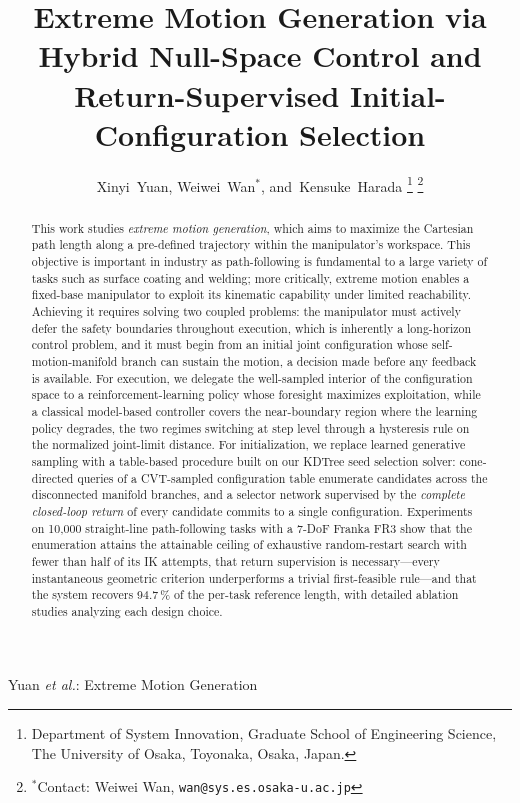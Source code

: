 \documentclass[journal]{IEEEtran}
\newcommand{\nEval}{10{,}000}
\newcommand{\phRatioAll}{94.7}     %
\begin{document}
\title{Extreme Motion Generation via Hybrid Null-Space Control and
Return-Supervised Initial-Configuration Selection}

\author{Xinyi~Yuan, Weiwei~Wan$^{*}$, and~Kensuke~Harada%
\thanks{Department of System Innovation, Graduate School of Engineering
Science, The University of Osaka, Toyonaka, Osaka, Japan.}%
\thanks{$^{*}$Contact: Weiwei Wan, \texttt{wan@sys.es.osaka-u.ac.jp}}}

%
{Yuan \MakeLowercase{\textit{et al.}}: Extreme Motion Generation}

\maketitle

\begin{abstract}
This work studies \textit{extreme motion generation}, which aims to
maximize the Cartesian path length along a pre-defined trajectory within
the manipulator's workspace. This objective is important in industry as
path-following is fundamental to a large variety of tasks such as surface
coating and welding; more critically, extreme motion enables a fixed-base
manipulator to exploit its kinematic capability under limited
reachability. Achieving it requires solving two coupled problems: the
manipulator must actively defer the safety boundaries throughout
execution, which is inherently a long-horizon control problem, and it
must begin from an initial joint configuration whose self-motion-manifold
branch can sustain the motion, a decision made before any feedback is
available. For execution, we delegate the well-sampled interior of the
configuration space to a reinforcement-learning policy whose foresight
maximizes exploitation, while a classical model-based controller covers
the near-boundary region where the learning policy degrades, the two
regimes switching at step level through a hysteresis rule on the
normalized joint-limit distance. For initialization, we replace learned
generative sampling with a table-based procedure built on our KDTree seed
selection solver: cone-directed queries of a CVT-sampled configuration
table enumerate candidates across the disconnected manifold branches, and
a selector network supervised by the \textit{complete closed-loop return}
of every candidate commits to a single configuration. Experiments on
\nEval{} straight-line path-following tasks with a 7-DoF Franka FR3 show
that the enumeration attains the attainable ceiling of exhaustive
random-restart search with fewer than half of its IK attempts, that
return supervision is necessary---every instantaneous geometric criterion
underperforms a trivial first-feasible rule---and that the system
recovers \phRatioAll\,\% of the per-task reference length, with detailed
ablation studies analyzing each design choice.
\end{abstract}
\end{document}
